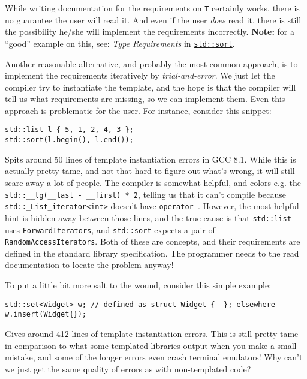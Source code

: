     

    While writing documentation for the requirements on \texttt{T} certainly works, there is no guarantee the user will read it. And even if the user \emph{does} read it, there is still the possibility he/she will implement the requirements incorrectly. \textbf{Note:} for a ``good'' example on this, see: \emph{Type Requirements} in \href{https://en.cppreference.com/w/cpp/algorithm/sort}{\texttt{std::sort}}.

    Another reasonable alternative, and probably the most common approach, is to implement the requirements iteratively by \emph{trial-and-error}. We just let the compiler try to instantiate the template, and the hope is that the compiler will tell us what requirements are missing, so we can implement them. Even this approach is problematic for the user. For instance, consider this snippet:

    \begin{lstlisting}
std::list l { 5, 1, 2, 4, 3 };
std::sort(l.begin(), l.end()); \end{lstlisting}

\noindent Spits around 50 lines of template instantiation errors in GCC 8.1. While this is actually pretty tame, and not that hard to figure out what's wrong, it will still scare away a lot of people. The compiler is somewhat helpful, and colors e.g. the \texttt{std::\_\_lg(\_\_last - \_\_first) * 2}, telling us that it can't compile because \texttt{std::\_List\_iterator<int>} doesn't have \texttt{operator-}. However, the most helpful hint is hidden away between those lines, and the true cause is that \texttt{std::list} uses \texttt{ForwardIterators}, and \texttt{std::sort} expects a pair of \texttt{RandomAccessIterators}. Both of these are concepts, and their requirements are defined in the standard library specification. The programmer needs to the read documentation to locate the problem anyway!

To put a little bit more salt to the wound, consider this simple example:

    \begin{lstlisting}
std::set<Widget> w; // defined as struct Widget {  }; elsewhere
w.insert(Widget{}); \end{lstlisting}

\noindent Gives around 412 lines of template instantiation errors. This is still pretty tame in comparison to what some templated libraries output when you make a small mistake, and some of the longer errors even crash terminal emulators! Why can't we just get the same quality of errors as with non-templated code?

